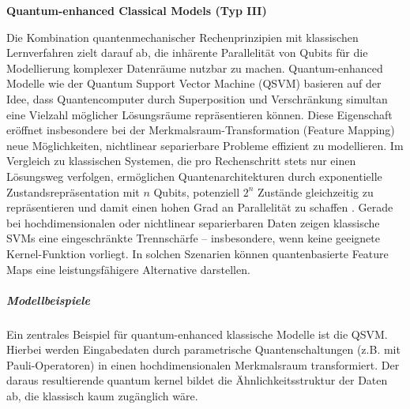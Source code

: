 \vspace{1.5em}
\noindent\textbf{Quantum-enhanced Classical Models (Typ III)}

\noindent
Die Kombination quantenmechanischer Rechenprinzipien mit klassischen Lernverfahren zielt darauf ab, die inhärente Parallelität von Qubits für die Modellierung komplexer Datenräume nutzbar zu machen. Quantum-enhanced Modelle wie der Quantum Support Vector Machine (QSVM) basieren auf der Idee, dass Quantencomputer durch Superposition und Verschränkung simultan eine Vielzahl möglicher Lösungsräume repräsentieren können. Diese Eigenschaft eröffnet insbesondere bei der Merkmalsraum-Transformation (Feature Mapping) neue Möglichkeiten, nichtlinear separierbare Probleme effizient zu modellieren. \cite{kavithaQuantumMachineLearning2024}
Im Vergleich zu klassischen Systemen, die pro Rechenschritt stets nur einen Lösungsweg verfolgen, ermöglichen Quantenarchitekturen durch exponentielle Zustandsrepräsentation mit \( n \) Qubits, potenziell \( 2^n \) Zustände gleichzeitig zu repräsentieren und damit einen hohen Grad an Parallelität zu schaffen \cite{gujjuQuantumMachineLearning2024}.
Gerade bei hochdimensionalen oder nichtlinear separierbaren Daten zeigen klassische SVMs eine eingeschränkte Trennschärfe – insbesondere, wenn keine geeignete Kernel-Funktion vorliegt. In solchen Szenarien können quantenbasierte Feature Maps eine leistungsfähigere Alternative 
darstellen. \cite{peral-garciaSystematicLiteratureReview2024}

\subparagraph{Modellbeispiele}
Ein zentrales Beispiel für quantum-enhanced klassische Modelle ist die QSVM. Hierbei werden Eingabedaten durch parametrische Quantenschaltungen (z.B. mit Pauli-Operatoren) in einen hochdimensionalen Merkmalsraum transformiert. Der daraus resultierende quantum kernel bildet die Ähnlichkeitsstruktur der Daten ab, die klassisch kaum zugänglich wäre. 


